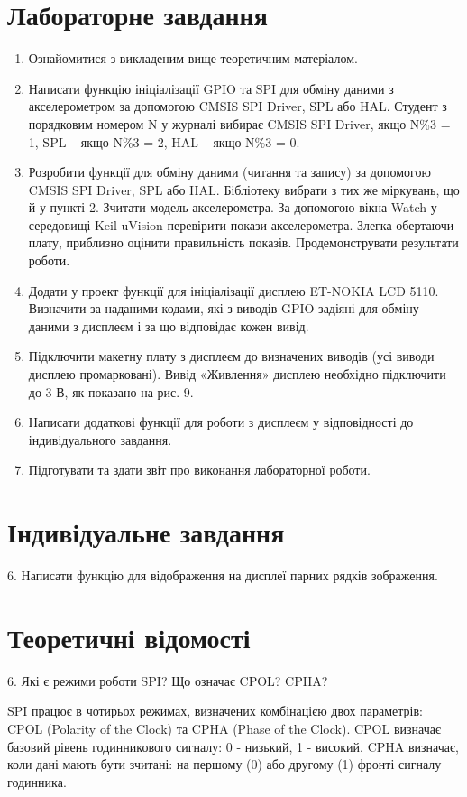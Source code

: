 \documentclass[oneside,14pt]{extarticle}
\begin{document}
\begin{normalsize}
    \section*{Лабораторне завдання}
    \begin{enumerate}
        \item Ознайомитися з викладеним вище теоретичним матеріалом.
        \item Написати функцію ініціалізації GPIO та SPI для обміну даними з акселерометром за допомогою CMSIS SPI Driver, SPL або HAL. Студент з порядковим номером N  у журналі вибирає CMSIS SPI Driver, якщо N\%3 = 1, SPL – якщо N\%3 = 2, HAL – якщо N\%3 = 0.
        \item Розробити функції для обміну даними (читання та запису) за допомогою  CMSIS SPI Driver, SPL або HAL. Бібліотеку вибрати з тих же міркувань, що й у пункті 2.
        Зчитати модель акселерометра. За допомогою вікна Watch у середовищі Keil uVision перевірити покази акселерометра. Злегка обертаючи плату, приблизно оцінити правильність показів. Продемонструвати результати роботи.
        \item Додати у проект функції для ініціалізації дисплею ET-NOKIA LCD 5110. Визначити за наданими кодами, які з виводів GPIO задіяні для обміну даними з дисплеєм і за що відповідає кожен вивід.
        \item Підключити макетну плату з дисплеєм до визначених виводів (усі виводи дисплею промарковані). Вивід «Живлення» дисплею необхідно підключити до 3 В, як показано на рис. 9.
        \item Написати додаткові функції для роботи з дисплеєм у відповідності до індивідуального завдання.
        \item Підготувати та здати звіт про виконання лабораторної роботи. 
    \end{enumerate}

	\section*{Індивідуальне завдання}
	6. Написати функцію для відображення на дисплеї парних рядків зображення.

	\section*{Теоретичні відомості}
	6. Які є режими роботи SPI? Що означає CPOL? CPHA?
	
	SPI працює в чотирьох режимах, визначених комбінацією двох параметрів: CPOL (Polarity of the Clock) та CPHA (Phase of the Clock). CPOL визначає базовий рівень годинникового сигналу: 0 - низький, 1 - високий. CPHA визначає, коли дані мають бути зчитані: на першому (0) або другому (1) фронті сигналу годинника.
	

\end{normalsize}
\end{document}
